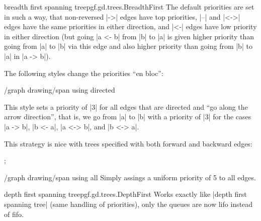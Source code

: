 \begin{gdalgorithm}{breadth first spanning tree}{pgf.gd.trees.BreadthFirst}
  The default priorities are set in such a way, that non-reversed |->|
  edges have top priorities, |--| and |<->| edges have the same
  priorities in either direction, and |<-| edges have low priority in
  either direction (but going |a <- b| from |b| to |a| is given higher
  priority than going from |a| to |b| via this edge and also higher
  priority than going from |b| to |a| in |a -> b|).
  
  The following styles change the priorities ``en bloc'':
  
  \begin{key}{/graph drawing/span using directed}
    
    This style sets a priority of |3| for all edges that are directed
    and ``go along the arrow direction'', that is, we go from |a| to
    |b| with a priority of |3| for the cases |a -> b|, |b <- a|,
    |a <-> b|, and |b <-> a|.
    
    This strategy is nice with trees specified with both forward and
    backward edges:
\begin{codeexample}[]
\tikz {};
\end{codeexample}
  \end{key}

  \begin{key}{/graph drawing/span using all}
    Simply assings a uniform priority of 5 to all edges.
  \end{key}
\end{gdalgorithm}

\begin{gdalgorithm}{depth first spanning tree}{pgf.gd.trees.DepthFirst}
  Works exactly like |depth first spanning tree| (same handling of
  priorities), only the queues are now lifo instead of
  fifo. 
\end{gdalgorithm}


